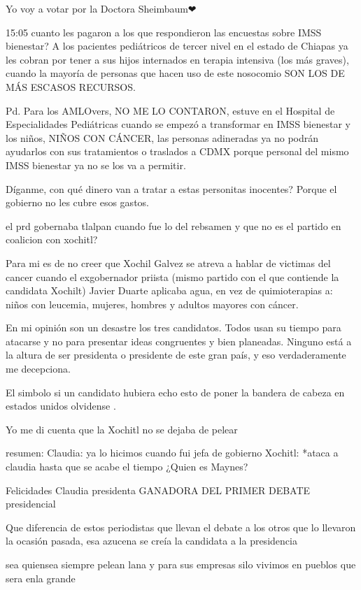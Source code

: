 Yo voy a votar por la Doctora Sheimbaum❤

15:05 cuanto les pagaron a los que respondieron las encuestas sobre IMSS bienestar? 
A los pacientes pediátricos de tercer nivel en el estado de Chiapas ya les cobran por tener a sus hijos internados en terapia intensiva (los más graves), cuando la mayoría de personas que hacen uso de este nosocomio SON LOS DE MÁS ESCASOS RECURSOS.

Pd. Para los AMLOvers, NO ME LO CONTARON, estuve en el Hospital de Especialidades Pediátricas cuando se empezó a transformar en IMSS bienestar y los niños, NIÑOS CON CÁNCER, las personas adineradas ya no podrán ayudarlos con sus tratamientos o traslados a CDMX porque personal del mismo IMSS bienestar ya no se los va a permitir. 

Díganme, con qué dinero van a tratar a estas personitas inocentes? Porque el gobierno no les cubre esos gastos.

el prd gobernaba tlalpan cuando fue lo del rebsamen y que no es el partido en coalicion con xochitl?

Para mi es de no creer que Xochil Galvez se atreva a hablar de victimas del cancer cuando el exgobernador priista (mismo partido con el que contiende la candidata Xochilt) Javier Duarte aplicaba agua, en vez de quimioterapias a: niños con leucemia, mujeres, hombres y adultos mayores con cáncer.

En mi opinión son un desastre los tres candidatos. Todos usan su tiempo para atacarse y no para presentar ideas congruentes y bien planeadas. Ninguno está a la altura de ser presidenta o presidente de este gran país, y eso verdaderamente me decepciona.

El simbolo si un candidato hubiera echo esto de poner la bandera de cabeza en estados unidos olvidense .

Yo me di cuenta que la Xochitl no se dejaba de pelear

resumen:
Claudia: ya lo hicimos cuando fui jefa de gobierno 
Xochitl: *ataca a claudia hasta que se acabe el tiempo 
¿Quien es Maynes?

Felicidades Claudia presidenta GANADORA DEL PRIMER DEBATE presidencial

Que diferencia de estos periodistas que llevan el debate a los otros que lo llevaron la ocasión pasada, esa azucena se creía la candidata a la presidencia 🤦‍♂️🤦‍♂️

sea quiensea  siempre  pelean lana  y para sus empresas silo vivimos en pueblos que sera enla grande

